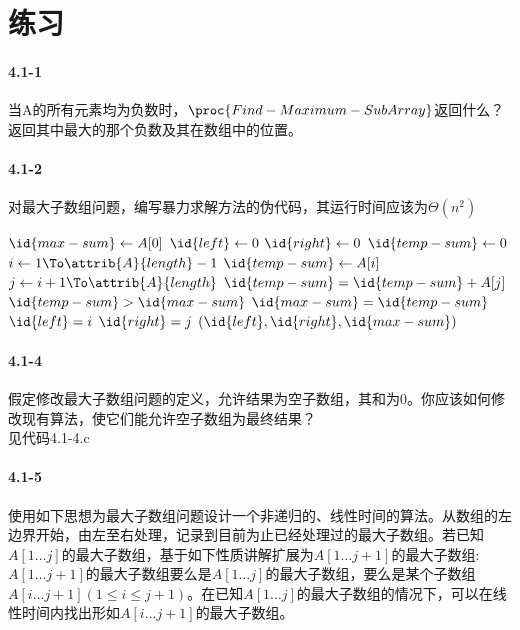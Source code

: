 \documentclass[a4paper,11pt]{article}
\begin{document}
\section*{练习}
\paragraph*{4.1-1}
当A的所有元素均为负数时，$\proc{Find-Maximum-SubArray}$返回什么？\\
返回其中最大的那个负数及其在数组中的位置。
\paragraph*{4.1-2}
对最大子数组问题，编写暴力求解方法的伪代码，其运行时间应该为$\Theta(n^2)$
\begin{codebox}
	\li $\id{max-sum} \gets A[0]$
	\li $\id{left} \gets 0$
	\li $\id{right} \gets 0$
	\li $\id{temp-sum} \gets 0$
	\li \For $i \gets 1 \To \attrib{A}{length}-1$
	\li		\Do $\id{temp-sum}\gets A[i]$
	\li		\For $j \gets i+1 \To \attrib{A}{length}$
	\li			\Do $\id{temp-sum} = \id{temp-sum} + A[j]$
	\li			\If $\id{temp-sum} > \id{max-sum}$
	\li				\Then $\id{max-sum}=\id{temp-sum}$
	\li				$\id{left} = i$
	\li				$\id{right} = j$
						\End
					\End
				\End
	\li \Return $(\id{left},\id{right},\id{max-sum})$
\end{codebox}
\paragraph*{4.1-4}
假定修改最大子数组问题的定义，允许结果为空子数组，其和为0。你应该如何修改现有算法，使它们能允许空子数组为最终结果？\\
见代码4.1-4.c
\paragraph*{4.1-5}
使用如下思想为最大子数组问题设计一个非递归的、线性时间的算法。从数组的左边界开始，由左至右处理，记录到目前为止已经处理过的最大子数组。若已知$A[1 \dots j]$的最大子数组，基于如下性质讲解扩展为$A[1 \dots j+1]$的最大子数组:$A[1 \dots j+1]$的最大子数组要么是$A[1 \dots j]$的最大子数组，要么是某个子数组$A[i \dots j+1](1 \leq i \leq j+1)$。在已知$A[1 \dots j]$的最大子数组的情况下，可以在线性时间内找出形如$A[i \dots j+1]$的最大子数组。
\end{document}
